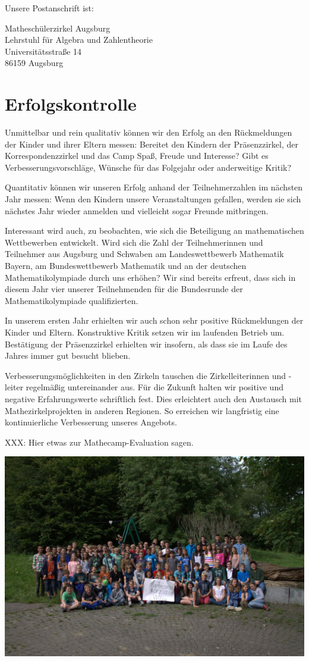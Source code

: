 \documentclass[12pt]{zettel}
\begin{document}
Unsere Postanschrift ist:
\vspace{-0.5em}
\begin{tabbing}
  {\qquad} Matheschülerzirkel Augsburg \\
  {\qquad} Lehrstuhl für Algebra und Zahlentheorie \\
  {\qquad} Universitätsstraße 14 \\
  {\qquad} 86159 Augsburg
\end{tabbing}


\section{Erfolgskontrolle}

Unmittelbar und rein qualitativ können wir den Erfolg an den Rückmeldungen der
Kinder und ihrer Eltern messen: Bereitet den Kindern der Präsenzzirkel, der
Korrespondenzzirkel und das Camp Spaß, Freude und Interesse? Gibt es
Verbesserungsvorschläge, Wünsche für das Folgejahr oder anderweitige Kritik?

Quantitativ können wir unseren Erfolg anhand der Teilnehmerzahlen im nächsten
Jahr messen: Wenn den Kindern unsere Veranstaltungen gefallen, werden sie sich
nächstes Jahr wieder anmelden und vielleicht sogar Freunde mitbringen.

Interessant wird auch, zu beobachten, wie sich die Beteiligung an
mathematischen Wettbewerben entwickelt. Wird sich die Zahl der
Teilnehmerinnen und Teilnehmer aus Augsburg und Schwaben am Landeswettbewerb
Mathematik Bayern, am Bundeswettbewerb Mathematik und an der deutschen
Mathematikolympiade durch uns erhöhen? Wir sind bereits erfreut,
dass sich in diesem Jahr vier unserer Teilnehmenden für die
Bundesrunde der Mathematikolympiade qualifizierten.

In unserem ersten Jahr erhielten wir auch schon sehr positive Rückmeldungen der
Kinder und Eltern. Konstruktive Kritik setzen wir im laufenden Betrieb um. Bestätigung der Präsenzzirkel erhielten wir insofern, als dass sie im Laufe des Jahres immer gut besucht blieben.

Verbesserungsmöglichkeiten in den Zirkeln tauschen die Zirkelleiterinnen und -leiter regelmäßig untereinander aus. Für die Zukunft halten wir positive und negative Erfahrungswerte schriftlich fest. Dies erleichtert auch den Austausch mit Mathezirkelprojekten in anderen Regionen. So erreichen wir langfristig eine kontinuierliche Verbesserung unseres Angebots.

XXX: Hier etwas zur Mathecamp-Evaluation sagen.


\vfill

\begin{center}
  \includegraphics[scale=0.3]{gruppenfoto}
\end{center}
\end{document}
